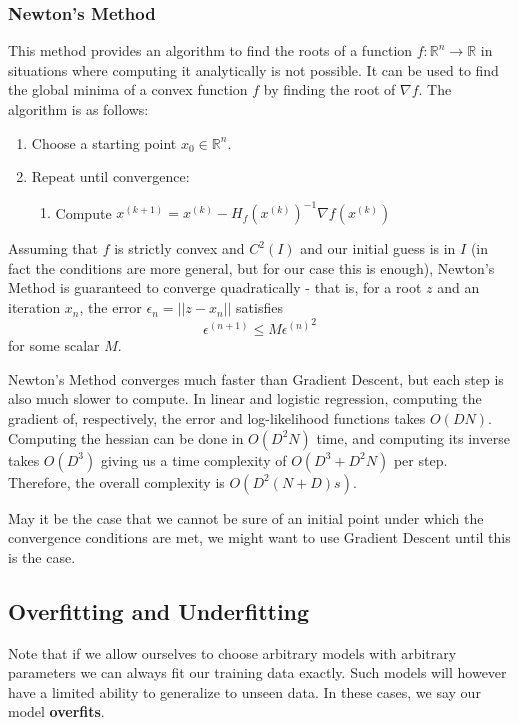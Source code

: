 \documentclass{article}
\newcommand{\R}{\mathbb{R}}
\begin{document}
\subsubsection{Newton's Method} 

This method provides an algorithm to find the roots of a function $f: \R^n \to \R$ in situations where computing it analytically is not possible.
It can be used to find the global minima of a convex function $f$ by finding the root of $\nabla f$.
The algorithm is as follows:
\begin{enumerate}
    \item Choose a starting point $x_0 \in \R^n$.
    \item Repeat until convergence:
    \begin{enumerate}
	\item Compute $x^{(k+1)} = x^{(k)} - H_f(x^{(k)})^{-1} \nabla f(x^{(k)})$
    \end{enumerate}
\end{enumerate}

Assuming that $f$ is strictly convex and $C^2(I)$ and our initial guess is in $I$ (in fact the conditions are more general, but for our case this is enough), Newton's Method is guaranteed to converge quadratically - that is, for a root $z$ and an iteration $x_n$, the error $\epsilon_n = ||z - x_n||$ satisfies
$$
\epsilon^{(n+1)} \leq M {\epsilon^{(n)}}^2
$$
for some scalar $M$.

Newton's Method converges much faster than Gradient Descent, but each step is also much slower to compute.
In linear and logistic regression, computing the gradient of, respectively, the error and log-likelihood functions takes $O(DN)$.
Computing the hessian can be done in $O(D^2N)$ time, and computing its inverse takes $O(D^3)$ giving us a time complexity of $O(D^3 + D^2N)$ per step.
Therefore, the overall complexity is $O(D^2(N+D)s)$.

May it be the case that we cannot be sure of an initial point under which the convergence conditions are met, we might want to use Gradient Descent until this is the case.

\subsection{Overfitting and Underfitting}

Note that if we allow ourselves to choose arbitrary models with arbitrary parameters we can always fit our training data exactly.
Such models will however have a limited ability to generalize to unseen data.
In these cases, we say our model \textbf{overfits}.
\end{document}
